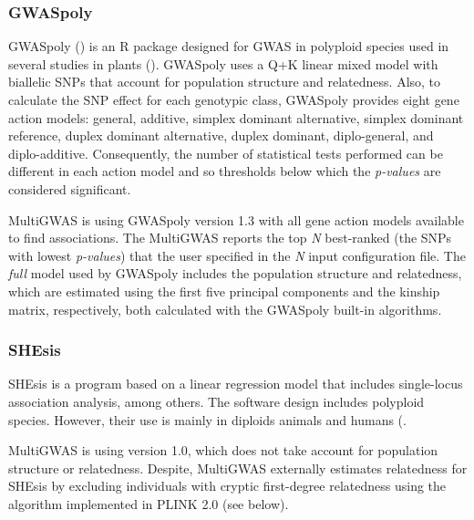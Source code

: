 \documentclass{article}
\begin{document}
\subsubsection{GWASpoly\label{subsec_GWASpoly}}
GWASpoly (\cite{Rosyara2016}) is an R package designed for GWAS in polyploid species used in several studies in plants (\cite{Berdugo2017, Ferrao2018, Sharma2018, Yuan2019}). GWASpoly uses a Q+K linear mixed model with biallelic SNPs that account for population structure and relatedness. Also, to calculate the SNP effect for each genotypic class, GWASpoly provides eight gene action models: general, additive, simplex dominant alternative, simplex dominant reference, duplex dominant alternative, duplex dominant, diplo-general, and diplo-additive. Consequently, the number of statistical tests performed can be different in each action model and so thresholds below which the \emph{p-values} are considered significant.

MultiGWAS is using GWASpoly version 1.3 with all gene action models available to find associations. The MultiGWAS reports the top \emph{N} best-ranked (the SNPs with lowest \emph{p-values})  that the user specified in the \emph{N} input configuration file. The \emph{full }model used by GWASpoly includes the population structure and relatedness, which are estimated using the first five principal components and the kinship matrix, respectively, both calculated with the GWASpoly built-in algorithms.

\subsubsection{SHEsis}


SHEsis is a program based on a linear regression model that includes single-locus association analysis, among others. The software design includes polyploid species. However, their use is mainly in diploids animals and humans (\cite{Qiao2015, Meng2019}.

MultiGWAS is using version 1.0, which does not take account for population structure or relatedness. Despite, MultiGWAS externally estimates relatedness for SHEsis by excluding individuals with cryptic first-degree relatedness using the algorithm implemented in PLINK 2.0 (see below).
\end{document}
